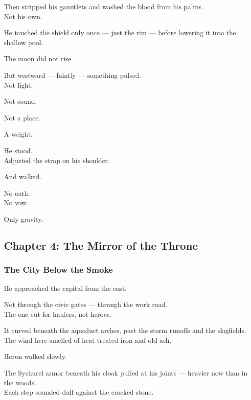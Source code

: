 \documentclass[12pt]{article}
\begin{document}
Then stripped his gauntlets and washed the blood from his palms.\\
Not his own.

He touched the shield only once — just the rim — before lowering it into the shallow pool.

\vspace{1em}

The moon did not rise.

But westward — faintly — something pulsed.\\
Not light.

Not sound.

Not a place.

A weight.

\vspace{1em}

He stood.\\
Adjusted the strap on his shoulder.

And walked.

\vspace{1em}

No oath.\\
No vow.

Only gravity.

\newpage

\subsection{Chapter 4: The Mirror of the Throne}

\vspace{.5in}

\subsubsection{The City Below the Smoke}

He approached the capital from the east.

Not through the civic gates — through the work road.\\
The one cut for haulers, not heroes.

It curved beneath the aqueduct arches, past the storm runoffs and the slagfields.\\
The wind here smelled of heat-treated iron and old ash.

\vspace{1em}

Heron walked slowly.

The Sychurel armor beneath his cloak pulled at his joints — heavier now than in the woods.\\
Each step sounded dull against the cracked stone.
\end{document}
